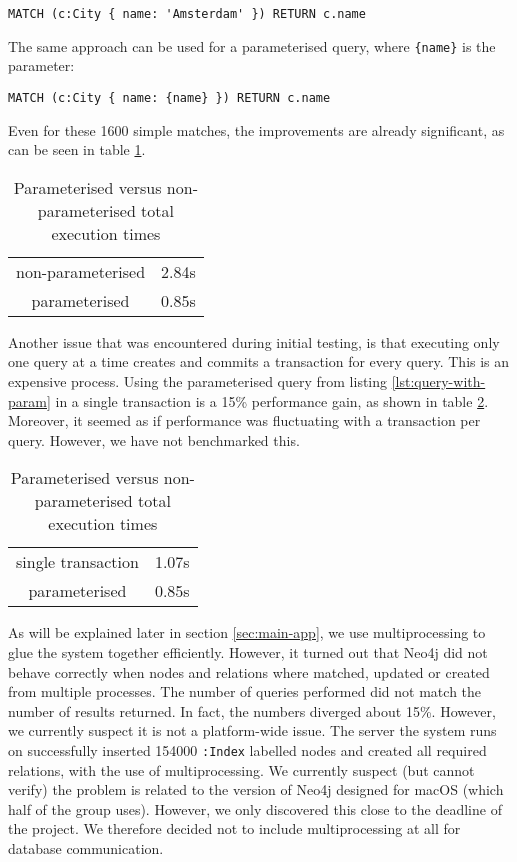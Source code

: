 \begin{lstlisting}[language=cypher, caption={Matching cities without parameterising}, label={lst:query-non-param}]
MATCH (c:City { name: 'Amsterdam' }) RETURN c.name
\end{lstlisting}

The same approach can be used for a parameterised query, where \texttt{\{name\}} is the parameter:
\begin{lstlisting}[language=cypher, caption={Matching cities without parameterising}, label={lst:query-with-param}]
MATCH (c:City { name: {name} }) RETURN c.name
\end{lstlisting}

Even for these 1600 simple matches, the improvements are already significant, as can be seen in table \ref{tbl:param-improvement}.
\begin{table}[H]
\centering
\begin{tabular}{|c|c|}
    \hline
    non-parameterised & 2.84s \\
    parameterised & 0.85s\\
    \hline
\end{tabular}
\caption{Parameterised versus non-parameterised total execution times}
\label{tbl:param-improvement}
\end{table}

Another issue that was encountered during initial testing, is that executing only one query at a time creates and commits a transaction for every query. This is an expensive process. Using the parameterised query from listing \ref{lst:query-with-param} in a single transaction is a 15\% performance gain, as shown in table \ref{tbl:bulk-improvement}. Moreover, it seemed as if performance was fluctuating with a transaction per query. However, we have not benchmarked this.
\begin{table}[H]
\centering
\begin{tabular}{|c|c|}
    \hline
    single transaction & 1.07s \\
    parameterised & 0.85s\\
    \hline
\end{tabular}
\caption{Parameterised versus non-parameterised total execution times}
\label{tbl:bulk-improvement}
\end{table}

As will be explained later in section \ref{sec:main-app}, we use multiprocessing to glue the system together efficiently. However, it turned out that Neo4j did not behave correctly when nodes and relations where matched, updated or created from multiple processes. The number of queries performed did not match the number of results returned. In fact, the numbers diverged about 15\%. However, we currently suspect it is not a platform-wide issue. The server the system runs on successfully inserted 154000 \texttt{:Index} labelled nodes and created all required relations, with the use of multiprocessing. We currently suspect (but cannot verify) the problem is related to the version of Neo4j designed for macOS (which half of the group uses). However, we only discovered this close to the deadline of the project. We therefore decided not to include multiprocessing at all for database communication.
